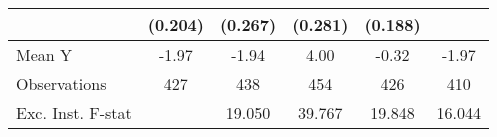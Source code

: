 {\begin{tabular}{l*{5}{c}}
            &     (0.204)         &     (0.267)         &     (0.281)         &     (0.188)         &                     \\
\midrule
Mean Y      &       -1.97         &       -1.94         &        4.00         &       -0.32         &       -1.97         \\
Observations&         427         &         438         &         454         &         426         &         410         \\
Exc. Inst. F-stat&                     &      19.050         &      39.767         &      19.848         &      16.044         \\
\bottomrule
\end{tabular}
}
